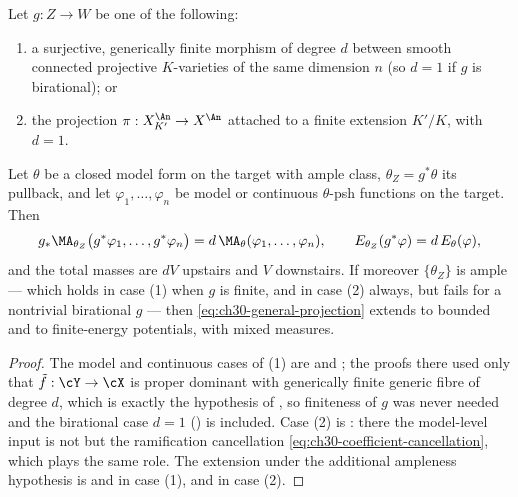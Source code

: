 \begin{theorem}
\label{thm:ch30-general-projection}
Let $g:Z\to W$ be one of the following:
\begin{enumerate}
\item a surjective, generically finite morphism of degree $d$ between
smooth connected projective $K$-varieties of the same dimension $n$
(so $d=1$ if $g$ is birational); or
\item the projection $\pi:X_{K'}^{\An}\to X^{\An}$ attached to a finite
extension $K'/K$, with $d=1$.
\end{enumerate}
Let $\theta$ be a closed model form on the target with ample class,
$\theta_Z=g^*\theta$ its pullback, and let
$\varphi_1,\ldots,\varphi_n$ be model or continuous $\theta$-psh
functions on the target.  Then
\begin{equation}
\label{eq:ch30-general-projection}
 g_*\MA_{\theta_Z}\bigl(g^*\varphi_1,\ldots,g^*\varphi_n\bigr)
 =d\,\MA_\theta(\varphi_1,\ldots,\varphi_n),
 \qquad
 E_{\theta_Z}(g^*\varphi)=d\,E_\theta(\varphi),
\end{equation}
and the total masses are $dV$ upstairs and $V$ downstairs.  If moreover
$\{\theta_Z\}$ is ample --- which holds in case (1) when $g$ is finite,
and in case (2) always, but fails for a nontrivial birational $g$ ---
then \eqref{eq:ch30-general-projection} extends to bounded and to
finite-energy potentials, with mixed measures.
\end{theorem}

\begin{proof}
The model and continuous cases of (1) are
 and
; the proofs there used only that
$\tilde f:\cY\to\cX$ is proper dominant with generically finite generic
fibre of degree $d$, which is exactly the hypothesis of
, so finiteness of $g$ was never
needed and the birational case $d=1$
() is included.  Case (2) is
: there the model-level input is not
 but the ramification cancellation
\eqref{eq:ch30-coefficient-cancellation}, which plays the same role.  The
extension under the additional ampleness hypothesis is
 and
 in case (1), and
 in case (2).
\end{proof}

